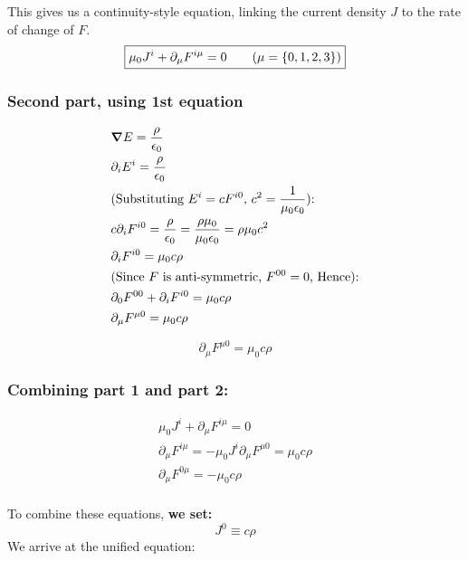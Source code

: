 This gives us a continuity-style equation, linking the current density $J$ to
the rate of change of $F$.
\begin{equation}
    \boxed{ \mu_0 J^i + \partial_\mu F^{i\mu} = 0 \tag{$\mu = \{0, 1, 2, 3 \}$} }
\end{equation}


\subsubsection{Second part, using 1st equation}

\begin{align*}
    &\grad E = \frac{\rho}{\epsilon_0} \\
    &\partial_i E^i = \frac{\rho}{\epsilon_0} \\
    &\text{(Substituting $E^i = c F^{i0}$, $c^2 = \frac{1}{\mu_0 \epsilon_0}$): } \\
    &c \partial_i F^{i0} = \frac{\rho}{\epsilon_0}  = \frac{\rho \mu_0}{\mu_0 \epsilon_0} = \rho \mu_0 c^2 \\
    &\partial_i F^{i0} = \mu_0 c \rho \\
    &\text{(Since $F$ is anti-symmetric, $F^{00} = 0$, Hence):}\\
    &\partial_0 F^{00} + \partial_i F^{i0} = \mu_0 c \rho \\
    &\partial_\mu F^{\mu 0} = \mu_0 c \rho
\end{align*}

\begin{equation}
    \boxed{ \partial_\mu F^{\mu0} = \mu_0 c \rho}
\end{equation}

\subsubsection{Combining part 1 and part 2:}


\begin{align*}
    \mu_0 J^i + \partial_\mu F^{i\mu} = 0 \tag{From $B$}  \\
    \partial_\mu F^{i\mu} = -\mu_0 J^i 
    \partial_\mu F^{\mu 0} = \mu_0 c \rho \\
    \partial_\mu F^{0 \mu} = - \mu_0 c \rho \\
\end{align*}

To combine these equations, \textbf{we set:}
\begin{equation}
    \boxed{J^0 \equiv c \rho}
\end{equation}
We arrive at the unified equation:

